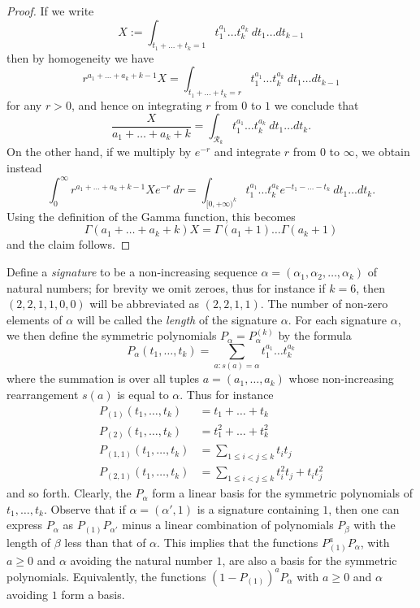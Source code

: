 \begin{proof}  If we write
$$ X := \int_{t_1+\dots+t_k=1} t_1^{a_1} \dots t_k^{a_k}\ dt_1 \dots dt_{k-1}$$
then by homogeneity we have
$$ r^{a_1+\dots+a_k+k-1} X = \int_{t_1+\dots+t_k=r} t_1^{a_1} \dots t_k^{a_k}\ dt_1 \dots dt_{k-1}$$
for any $r > 0$, and hence on integrating $r$ from $0$ to $1$ we conclude that
$$ \frac{X}{a_1+\dots+a_k+k} = \int_{{\mathcal R}_k} t_1^{a_1} \dots t_k^{a_k}\ dt_1 \dots dt_k.$$
On the other hand, if we multiply by $e^{-r}$ and integrate $r$ from $0$ to $\infty$, we obtain instead
$$ \int_0^\infty r^{a_1+\dots+a_k+k-1} X e^{-r}\ dr = \int_{[0,+\infty)^k} t_1^{a_1} \dots t_k^{a_k} e^{-t_1-\dots-t_k}\ dt_1 \dots dt_k.$$
Using the definition of the Gamma function, this becomes
$$ \Gamma(a_1+\dots+a_k+k) X = \Gamma(a_1+1) \dots \Gamma(a_k+1)$$
and the claim follows.
\end{proof}

Define a \emph{signature} to be a non-increasing sequence $\alpha = (\alpha_1,\alpha_2,\dots,\alpha_k)$ of natural numbers; for brevity we omit zeroes, thus for instance if $k=6$, then $(2,2,1,1,0,0)$ will be abbreviated as $(2,2,1,1)$.  The number of non-zero elements of $\alpha$ will be called the \emph{length} of the signature $\alpha$.  For each signature $\alpha$, we then define the symmetric polynomials $P_\alpha = P^{(k)}_\alpha$ by the formula
$$ 
P_\alpha(t_1,\dots,t_k) = \sum_{a: s(a)=\alpha} t_1^{a_1} \dots t_k^{a_k}$$
where the summation is over all tuples $a = (a_1,\dots,a_k)$ whose non-increasing rearrangement $s(a)$ is equal to $\alpha$.  Thus for instance
\begin{align*}
P_{(1)}(t_1,\dots,t_k) &= t_1 + \dots + t_k \\
P_{(2)}(t_1,\dots,t_k) &= t_1^2 + \dots + t_k^2 \\
P_{(1,1)}(t_1,\dots,t_k) &= \sum_{1 \leq i < j \leq k} t_i t_j \\
P_{(2,1)}(t_1,\dots,t_k) &= \sum_{1 \leq i < j \leq k} t_i^2 t_j + t_i t_j^2 
\end{align*}
and so forth.  Clearly, the $P_\alpha$ form a linear basis for the symmetric polynomials of $t_1,\dots,t_k$.  Observe that if $\alpha = (\alpha',1)$ is a signature containing $1$, then one can express $P_\alpha$ as $P_{(1)} P_{\alpha'}$ minus a linear combination of polynomials $P_\beta$ with the length of $\beta$ less than that of $\alpha$.  This implies that the functions $P_{(1)}^a P_\alpha$, with $a \geq 0$ and $\alpha$ avoiding the natural number $1$, are also a basis for the symmetric polynomials.  Equivalently, the functions $(1-P_{(1)})^a P_\alpha$ with $a \geq 0$ and $\alpha$ avoiding $1$ form a basis.

